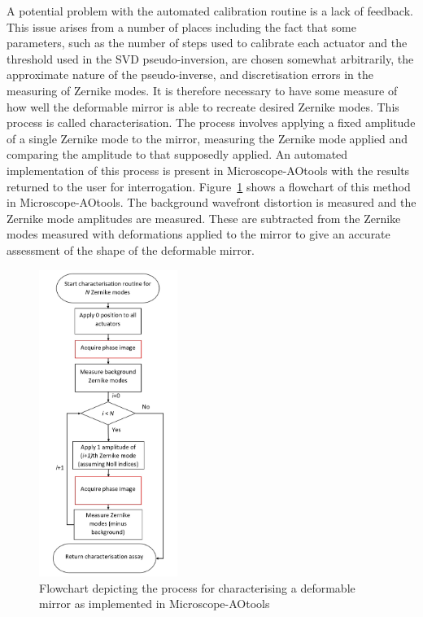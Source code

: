 A potential problem with the automated calibration routine is a lack of feedback. This issue arises from a number of places including the fact that some parameters, such as the number of steps used to calibrate each actuator and the threshold used in the SVD pseudo-inversion, are chosen somewhat arbitrarily, the approximate nature of the pseudo-inverse, and discretisation errors in the measuring of Zernike modes. It is therefore necessary to have some measure of how well the deformable mirror is able to recreate desired Zernike modes. This process is called characterisation. The process involves applying a fixed amplitude of a single Zernike mode to the mirror, measuring the Zernike mode applied and comparing the amplitude to that supposedly applied. An automated implementation of this process is present in Microscope-AOtools with the results returned to the user for interrogation. Figure~\ref{fig:characterisation_workflow} shows a flowchart of this method in Microscope-AOtools. The background wavefront distortion is measured and the Zernike mode amplitudes are measured. These are subtracted from the Zernike modes measured with deformations applied to the mirror to give an accurate assessment of the shape of the deformable mirror. 

\begin{figure}[h]
	\centering
	\includegraphics[width=0.4\textwidth, scale=0.5]{./images/characterisation_workflow.jpg}
	\caption{Flowchart depicting the process for characterising a deformable mirror as implemented in Microscope-AOtools}
	\label{fig:characterisation_workflow}
\end{figure}

